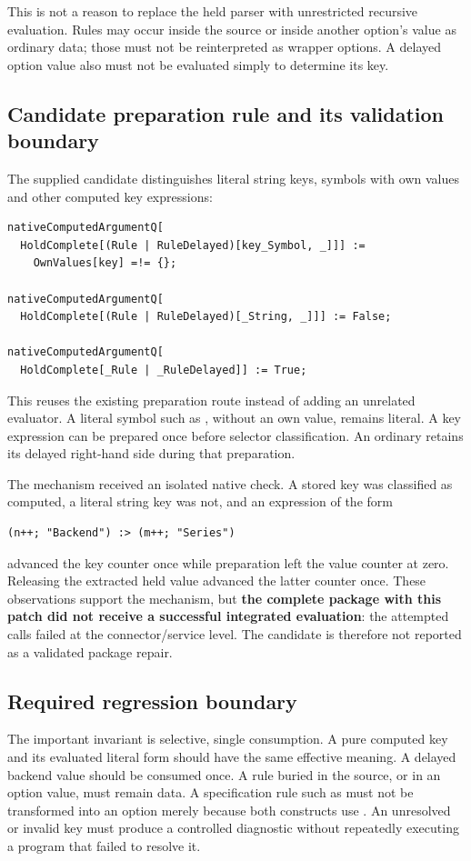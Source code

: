 \documentclass[11pt,a4paper]{article}
\newcommand{\code}[1]{\texttt{\detokenize{#1}}}
\begin{document}
This is not a reason to replace the held parser with unrestricted recursive evaluation. Rules may occur inside the source or inside another option's value as ordinary data; those must not be reinterpreted as wrapper options. A delayed option value also must not be evaluated simply to determine its key.

\subsection{Candidate preparation rule and its validation boundary}
The supplied candidate distinguishes literal string keys, symbols with own values and other computed key expressions:
\begin{lstlisting}
nativeComputedArgumentQ[
  HoldComplete[(Rule | RuleDelayed)[key_Symbol, _]]] :=
    OwnValues[key] =!= {};

nativeComputedArgumentQ[
  HoldComplete[(Rule | RuleDelayed)[_String, _]]] := False;

nativeComputedArgumentQ[
  HoldComplete[_Rule | _RuleDelayed]] := True;
\end{lstlisting}
This reuses the existing preparation route instead of adding an unrelated evaluator. A literal symbol such as \code{Assumptions}, without an own value, remains literal. A key expression can be prepared once before selector classification. An ordinary \code{RuleDelayed} retains its delayed right-hand side during that preparation.

The mechanism received an isolated native check. A stored key was classified as computed, a literal string key was not, and an expression of the form
\begin{lstlisting}
(n++; "Backend") :> (m++; "Series")
\end{lstlisting}
advanced the key counter once while preparation left the value counter at zero. Releasing the extracted held value advanced the latter counter once. These observations support the mechanism, but \textbf{the complete package with this patch did not receive a successful integrated evaluation}: the attempted calls failed at the connector/service level. The candidate is therefore not reported as a validated package repair.

\subsection{Required regression boundary}
The important invariant is selective, single consumption. A pure computed key and its evaluated literal form should have the same effective meaning. A delayed backend value should be consumed once. A rule buried in the source, or in an option value, must remain data. A specification rule such as \code{x -> 0} must not be transformed into an option merely because both constructs use \code{Rule}. An unresolved or invalid key must produce a controlled diagnostic without repeatedly executing a program that failed to resolve it.
\end{document}
